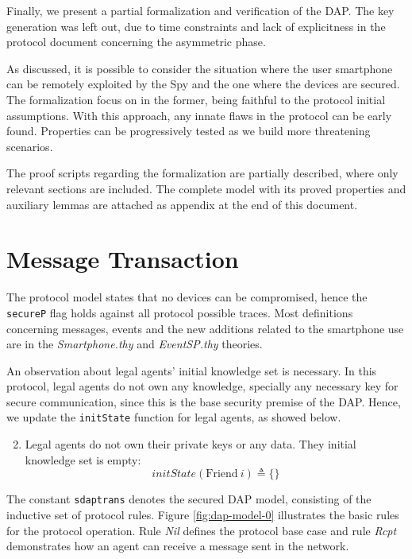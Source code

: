 Finally, we present a partial formalization and verification of the DAP\@. The key generation was left out, due to time constraints and lack of explicitness in the protocol document concerning the asymmetric phase.

As discussed, it is possible to consider the situation where the user smartphone can be remotely exploited by the Spy and the one where the devices are secured. The formalization focus on in the former, being faithful to the protocol initial assumptions. With this approach, any innate flaws in the protocol can be early found. Properties can be progressively tested as we build more threatening scenarios.

The proof scripts regarding the formalization are partially described, where only relevant sections are included. The complete model with its proved properties and auxiliary lemmas are attached as appendix at the end of this document.

\section{Message Transaction}
The protocol model states that no devices can be compromised, hence the \texttt{secureP} flag holds against all protocol possible traces. Most definitions concerning messages, events and the new additions related to the smartphone use are in the \textit{Smartphone.thy} and \textit{EventSP.thy} theories.

An observation about legal agents' initial knowledge set is necessary. In this protocol, legal agents do not own any knowledge, specially any necessary key for secure communication, since this is the base security premise of the DAP. Hence, we update the \texttt{initState} function for legal agents, as showed below.

\begin{enumerate}
  \setcounter{enumi}{1}

  \item Legal agents do not own their private keys or any data. They initial knowledge set is empty:
  \begin{equation*}
    initState (\text{Friend} \ i) \triangleq \{\}
  \end{equation*}
\end{enumerate}

The constant \texttt{sdaptrans} denotes the secured DAP model, consisting of the inductive set of protocol rules. Figure \ref{fig:dap-model-0} illustrates the basic rules for the protocol operation. Rule \textit{Nil} defines the protocol base case and rule \textit{Rcpt} demonstrates how an agent can receive a message sent in the network.

